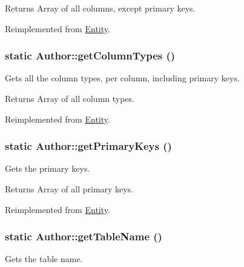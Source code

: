 \begin{DoxyReturn}{Returns}
Array of all columns, except primary keys. 
\end{DoxyReturn}


Reimplemented from \hyperlink{classEntity_a394717a08ffd54ec9a14d06727c86719}{Entity}.

\hypertarget{classAuthor_a305006a9a8889149f9103b1c5d762aa9}{
\subsubsection[{getColumnTypes}]{\setlength{\rightskip}{0pt plus 5cm}static Author::getColumnTypes ()}}
\label{classAuthor_a305006a9a8889149f9103b1c5d762aa9}
Gets all the column types, per column, including primary keys.

\begin{DoxyReturn}{Returns}
Array of all column types. 
\end{DoxyReturn}


Reimplemented from \hyperlink{classEntity_ad69437219c10955803707fbf6ac458e7}{Entity}.

\hypertarget{classAuthor_abeb5bf2d5739d0e46522c608c04db776}{
\subsubsection[{getPrimaryKeys}]{\setlength{\rightskip}{0pt plus 5cm}static Author::getPrimaryKeys ()}}
\label{classAuthor_abeb5bf2d5739d0e46522c608c04db776}
Gets the primary keys.

\begin{DoxyReturn}{Returns}
Array of all primary keys. 
\end{DoxyReturn}


Reimplemented from \hyperlink{classEntity_a61bbfbb4058427174e002a09ddc77c41}{Entity}.

\hypertarget{classAuthor_a83c8f19c169bcfffb4e0df09fadafe26}{
\subsubsection[{getTableName}]{\setlength{\rightskip}{0pt plus 5cm}static Author::getTableName ()}}
\label{classAuthor_a83c8f19c169bcfffb4e0df09fadafe26}
Gets the table name.

